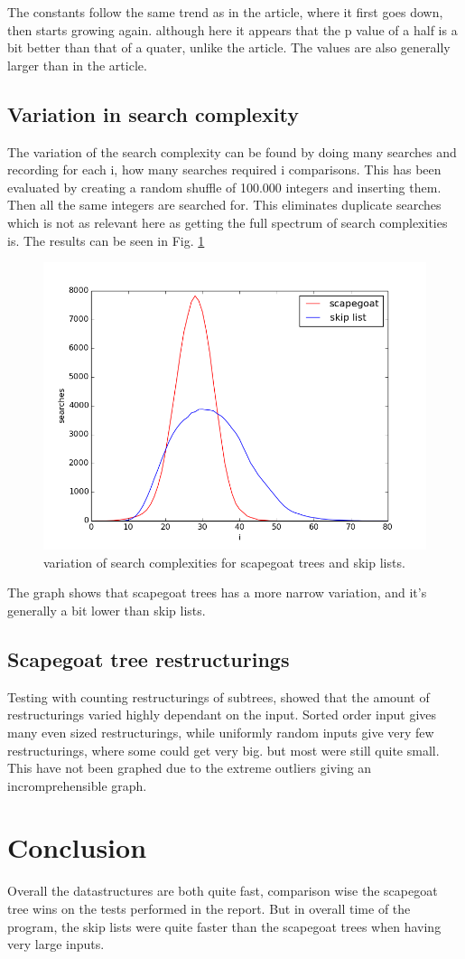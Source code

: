 \documentclass[12pt, a4paper]{article}
\begin{document}
The constants follow the same trend as in the article, where it first goes down, then starts growing again. although here it appears that the 
p value of a half is a bit better than that of a quater, unlike the article. The values are also generally larger than in the article.


\subsection*{Variation in search complexity}
The variation of the search complexity can be found by doing many searches and recording for each i, how many searches required i comparisons.
This has been evaluated by creating a random shuffle of 100.000 integers and inserting them. Then all the same integers are searched for.
This eliminates duplicate searches which is not as relevant here as getting the full spectrum of search complexities is. The results 
can be seen in Fig. \ref{variation}

\begin{figure}[H]
    \centering
    \includegraphics[width=1\textwidth]{variation.png}
    \caption{variation of search complexities for scapegoat trees and skip lists.}
    \label{variation}
\end{figure}

The graph shows that scapegoat trees has a more narrow variation, and it's generally a bit lower than skip lists.

\subsection*{Scapegoat tree restructurings}
Testing with counting restructurings of subtrees, showed that the amount of restructurings varied highly dependant on the input. 
Sorted order input gives many even sized restructurings, while uniformly random inputs give very few restructurings, where some could get very big.
but most were still quite small. This have not been graphed due to the extreme outliers giving an incromprehensible graph. 



\section*{Conclusion}
Overall the datastructures are both quite fast, comparison wise the scapegoat tree wins on the tests performed in the report. But in overall time 
of the program, the skip lists were quite faster than the scapegoat trees when having very large inputs.
\end{document}
